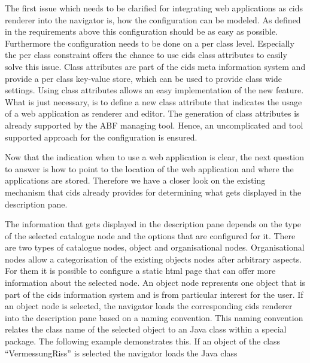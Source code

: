 The first issue which needs to be clarified for integrating web applications as cids renderer into the navigator is, how the configuration can be modeled.
As defined in the requirements above this configuration should be as easy as possible.
Furthermore the configuration needs to be done on a per class level.
Especially the per class constraint offers the chance to use cids class attributes to easily solve this issue.
Class attributes are part of the cids meta information system and provide a per class key-value store, which can be used to provide class wide settings.
Using class attributes allows an easy implementation of the new feature.
What is just necessary, is to define a new class attribute that indicates the usage of a web application as renderer and editor.
The generation of class attributes is already supported by the ABF managing tool.
Hence, an uncomplicated and tool supported approach for the configuration is ensured.

Now that the indication when to use a web application is clear, the next question to answer is how to point to the location of the web application and where the applications are stored. Therefore we  have a closer look on the existing mechanism that cids already provides for determining what gets displayed in the description pane.

The information that gets displayed in the description pane depends on the type of the selected catalogue node and the options that are configured for it.
There are two types of catalogue nodes, object and organisational nodes. Organisational nodes allow a categorisation of the existing objects nodes after arbitrary aspects.
For them it is possible to configure a static html page that can offer more information about the selected node.
An object node represents one object that is part of the cids information system and is from particular interest for the user.
 If an object node is selected, the navigator loads the corresponding cids  renderer into the description pane based on a naming convention.
This naming convention relates the class name of the selected object to an Java class within a special package. 
The following example demonstrates this. If an object of the class \enquote{VermessungRiss} is selected the navigator loads the Java class 

\indent \centerline{}

